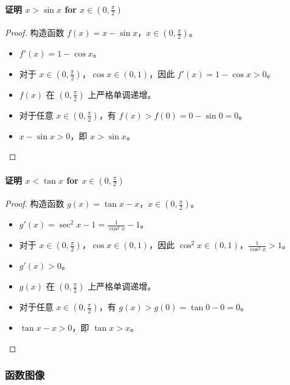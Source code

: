\documentclass[a4paper,12pt]{ctexart}
\theoremstyle{mytheoremstyle}
\begin{document}
\paragraph{证明 $x > \sin x$ for $x \in (0, \frac{\pi}{2})$}
\begin{proof}
构造函数 $f(x) = x - \sin x$，$x \in (0, \frac{\pi}{2})$。
\begin{itemize}
    \item[∵] $f'(x) = 1 - \cos x$。
    \item[∵] 对于 $x \in (0, \frac{\pi}{2})$，$\cos x \in (0, 1)$，因此 $f'(x) = 1 - \cos x > 0$。
    \item[∴] $f(x)$ 在 $(0, \frac{\pi}{2})$ 上严格单调递增。
    \item[∴] 对于任意 $x \in (0, \frac{\pi}{2})$，有 $f(x) > f(0) = 0 - \sin 0 = 0$。
    \item[∴] $x - \sin x > 0$，即 $x > \sin x$。
\end{itemize}
\end{proof}

\paragraph{证明 $x < \tan x$ for $x \in (0, \frac{\pi}{2})$}
\begin{proof}
构造函数 $g(x) = \tan x - x$，$x \in (0, \frac{\pi}{2})$。
\begin{itemize}
    \item[∵] $g'(x) = \sec^2 x - 1 = \frac{1}{\cos^2 x} - 1$。
    \item[∵] 对于 $x \in (0, \frac{\pi}{2})$，$\cos x \in (0, 1)$，因此 $\cos^2 x \in (0, 1)$，$\frac{1}{\cos^2 x} > 1$。
    \item[∴] $g'(x) > 0$。
    \item[∴] $g(x)$ 在 $(0, \frac{\pi}{2})$ 上严格单调递增。
    \item[∴] 对于任意 $x \in (0, \frac{\pi}{2})$，有 $g(x) > g(0) = \tan 0 - 0 = 0$。
    \item[∴] $\tan x - x > 0$，即 $\tan x > x$。
\end{itemize}
\end{proof}

\subsubsection*{\textcolor{MyGreen}{函数图像}}
\begin{center}
\end{center}
\end{document}
